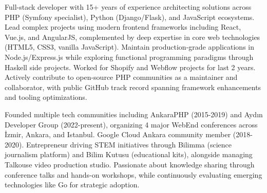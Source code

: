 

\begin{cvparagraph}

  Full-stack developer with 15+ years of experience architecting solutions across PHP (Symfony specialist), Python (Django/Flask), and JavaScript ecosystems. Lead complex projects using modern frontend frameworks including React, Vue.js, and AngularJS, complemented by deep expertise in core web technologies (HTML5, CSS3, vanilla JavaScript). Maintain production-grade applications in Node.js/Express.js while exploring functional programming paradigms through Haskell side projects. Worked for Shopify and Webflow projects for last 2 years. Actively contribute to open-source PHP communities as a maintainer and collaborator, with public GitHub track record spanning framework enhancements and tooling optimizations.

\medskip

Founded multiple tech communities including AnkaraPHP (2015-2019) and Aydın Developer Group (2022-present), organizing 4 major WebEnd conferences across İzmir, Ankara, and Istanbul. Google Cloud Ankara community member (2018-2020). Entrepreneur driving STEM initiatives through Bilimma (science journalism platform) and Bilim Kutusu (educational kits), alongside managing Talkouse video production studio. Passionate about knowledge sharing through conference talks and hands-on workshops, while continuously evaluating emerging technologies like Go for strategic adoption.

\end{cvparagraph}
